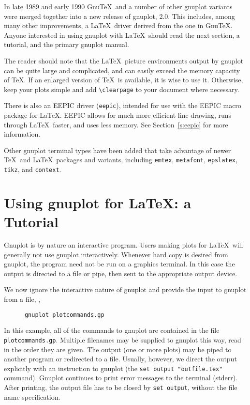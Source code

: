 In late 1989 and early 1990 Gnu\TeX\ and a number of other gnuplot
variants were merged together into a new release of gnuplot, 2.0. This
includes, among many other improvements, a \LaTeX\ driver derived from
the one in Gnu\TeX.
Anyone interested in using gnuplot with \LaTeX\ should read the next
section, a tutorial, and the primary gnuplot manual.

The reader should note that the \LaTeX\ picture environments output by
gnuplot can be quite large and complicated, and can easily exceed the
memory capacity of \TeX. If an enlarged version of \TeX\ is available,
it is wise to use it. Otherwise, keep your plots simple and add
\verb+\clearpage+ to your document where necessary.

There is also an EEPIC driver ({\tt eepic}), intended for use with
the EEPIC macro package for \LaTeX. EEPIC allows for much more
efficient line-drawing, runs through \LaTeX\ faster, and uses less
memory.  See Section~\ref{s:eepic} for more information.

Other gnuplot terminal types have been added that take advantage of
newer \TeX\ and \LaTeX\ packages and variants, including {\tt emtex}, 
{\tt metafont}, {\tt epslatex}, {\tt tikz}, and {\tt context}.

\section{Using gnuplot for \LaTeX: a Tutorial}

Gnuplot is by nature an interactive program. Users making plots for
\LaTeX\ will generally not use gnuplot interactively.  Whenever hard
copy is desired from gnuplot, the program need not be run on a
graphics terminal. In this case the output is directed to a file or
pipe, then sent to the appropriate output device.

We now ignore the interactive nature of gnuplot and provide the input
to gnuplot from a file, \ie,
\begin{verbatim}
      gnuplot plotcommands.gp
\end{verbatim}
In this example, all of the commands to gnuplot are contained in the
file {\tt plotcommands.gp}. Multiple filenames may be supplied to gnuplot
this way, read in the order they are given.  The output (one or more
plots) may be piped to another program or redirected to a file.
Usually, however, we direct the output explicitly with an instruction
to gnuplot (the {\tt set output "outfile.tex"} command). Gnuplot continues to
print error messages to the terminal (stderr). After printing, the output file
has to be closed by {\tt set output}, \ie{} without the file name specification.

